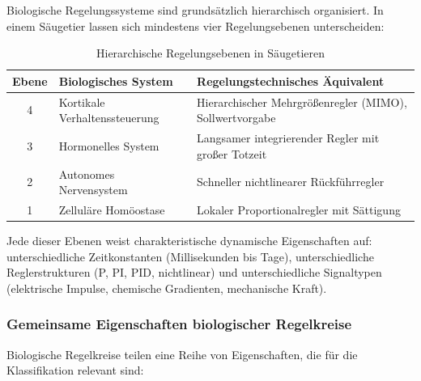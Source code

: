 \documentclass[a4paper,12pt]{article}
\theoremstyle{definition}
\begin{document}
Biologische Regelungssysteme sind grundsätzlich hierarchisch organisiert.
In einem Säugetier lassen sich mindestens vier Regelungsebenen unterscheiden:

\begin{table}[h]
	\centering
	\begin{tabular}{@{}clp{6.5cm}@{}}
		\toprule
		\textbf{Ebene} & \textbf{Biologisches System} & \textbf{Regelungstechnisches Äquivalent} \\
		\midrule
		4 & Kortikale Verhaltenssteuerung     & Hierarchischer Mehrgrößenregler (MIMO), Sollwertvorgabe \\
		3 & Hormonelles System                & Langsamer integrierender Regler mit großer Totzeit \\
		2 & Autonomes Nervensystem            & Schneller nichtlinearer Rückführregler \\
		1 & Zelluläre Homöostase              & Lokaler Proportionalregler mit Sättigung \\
		\bottomrule
	\end{tabular}
	\caption{Hierarchische Regelungsebenen in Säugetieren}
	\label{tab:bio_ebenen}
\end{table}

Jede dieser Ebenen weist charakteristische dynamische Eigenschaften auf:
unterschiedliche Zeitkonstanten (Millisekunden bis Tage), unterschiedliche
Reglerstrukturen (P, PI, PID, nichtlinear) und unterschiedliche
Signaltypen (elektrische Impulse, chemische Gradienten, mechanische Kraft).

\subsubsection{Gemeinsame Eigenschaften biologischer Regelkreise}

Biologische Regelkreise teilen eine Reihe von Eigenschaften, die für die
Klassifikation relevant sind:
\end{document}
